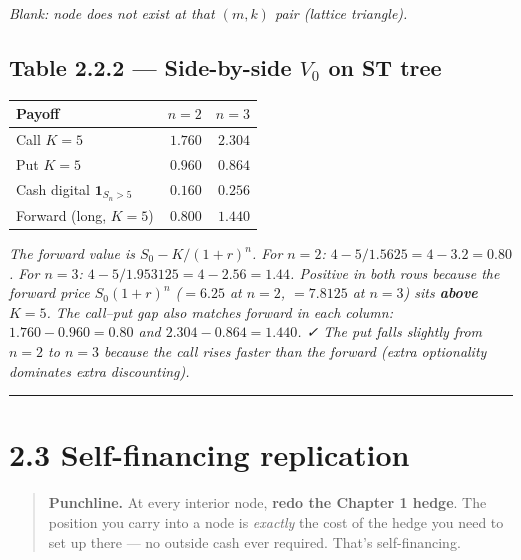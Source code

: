 \documentclass[
  10pt,
  twoside]{book}
\newcounter{none} %
\begin{document}
\emph{Blank: node does not exist at that \((m,k)\) pair (lattice
triangle).}

\subsection{\texorpdfstring{Table 2.2.2 --- Side-by-side \(V_0\) on ST
tree}{Table 2.2.2 --- Side-by-side V\_0 on ST tree}}\label{table-2.2.2-side-by-side-v_0-on-st-tree}

{\def\LTcaptype{none} %
\begin{table}[H]
\centering
\begin{tabular}{|l|r|r|}
\toprule
Payoff & \(n=2\) & \(n=3\) \\
\midrule



Call \(K=5\) & \(1.760\) & \(2.304\) \\
Put \(K=5\) & \(0.960\) & \(0.864\) \\
Cash digital \(\mathbf 1_{S_n>5}\) & \(0.160\) & \(0.256\) \\
Forward (long, \(K=5\)) & \(0.800\) & \(1.440\) \\
\bottomrule
\end{tabular}
\end{table}
}

\emph{The forward value is \(S_0 - K/(1+r)^n\). For \(n=2\):
\(4 - 5/1.5625 = 4-3.2 = 0.80\). For \(n=3\):
\(4 - 5/1.953125 = 4-2.56 = 1.44\). Positive in both rows because the
forward price \(S_0(1+r)^n\) (\(=6.25\) at \(n=2\), \(=7.8125\) at
\(n=3\)) sits \textbf{above} \(K=5\). The call--put gap also matches
forward in each column: \(1.760-0.960=0.80\) and \(2.304-0.864=1.440\).
✓ The put falls slightly from \(n=2\) to \(n=3\) because the call rises
faster than the forward (extra optionality dominates extra
discounting).}

\begin{center}\rule{0.5\linewidth}{0.5pt}\end{center}

\section{2.3 Self-financing
replication}\label{self-financing-replication}

\begin{quote}
\textbf{Punchline.} At every interior node, \textbf{redo the Chapter 1
hedge}. The position you carry into a node is \emph{exactly} the cost of
the hedge you need to set up there --- no outside cash ever required.
That's self-financing.
\end{quote}
\end{document}
